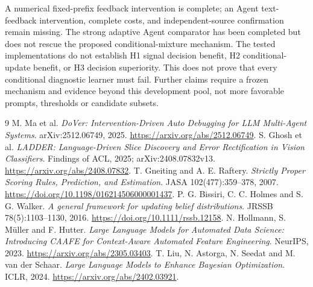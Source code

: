 \documentclass[10pt]{article}
\begin{document}
A numerical fixed-prefix feedback intervention is complete; an Agent text-feedback intervention, complete costs, and independent-source confirmation remain missing.
The strong adaptive Agent comparator has been completed but does not rescue the proposed conditional-mixture mechanism.
The tested implementations do not establish H1 signal decision benefit, H2 conditional-update benefit, or H3 decision superiority.
This does not prove that every conditional diagnostic learner must fail.
Further claims require a frozen mechanism and evidence beyond this development pool, not more favorable prompts, thresholds or candidate subsets.

\begin{thebibliography}{9}
 M. Ma et al. \emph{DoVer: Intervention-Driven Auto Debugging for LLM Multi-Agent Systems}. arXiv:2512.06749, 2025. \url{https://arxiv.org/abs/2512.06749}.
 S. Ghosh et al. \emph{LADDER: Language-Driven Slice Discovery and Error Rectification in Vision Classifiers}. Findings of ACL, 2025; arXiv:2408.07832v13. \url{https://arxiv.org/abs/2408.07832}.
 T. Gneiting and A. E. Raftery. \emph{Strictly Proper Scoring Rules, Prediction, and Estimation}. JASA 102(477):359--378, 2007. \url{https://doi.org/10.1198/016214506000001437}.
 P. G. Bissiri, C. C. Holmes and S. G. Walker. \emph{A general framework for updating belief distributions}. JRSSB 78(5):1103--1130, 2016. \url{https://doi.org/10.1111/rssb.12158}.
 N. Hollmann, S. M\"uller and F. Hutter. \emph{Large Language Models for Automated Data Science: Introducing CAAFE for Context-Aware Automated Feature Engineering}. NeurIPS, 2023. \url{https://arxiv.org/abs/2305.03403}.
 T. Liu, N. Astorga, N. Seedat and M. van der Schaar. \emph{Large Language Models to Enhance Bayesian Optimization}. ICLR, 2024. \url{https://arxiv.org/abs/2402.03921}.
\end{thebibliography}
\end{document}

